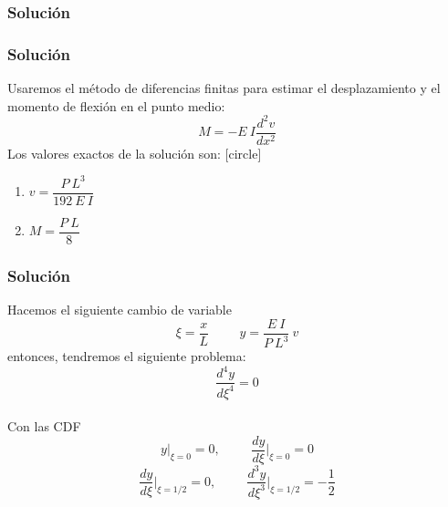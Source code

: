 \subsubsection{Solución}
\begin{frame}
\frametitle{Solución}
Usaremos el método de diferencias finitas para estimar el desplazamiento y el momento de flexión en el punto medio:
\[ M = - E \: I \dfrac{d^{2} v}{d x^{2}} \]
Los valores exactos de la solución son:
[circle]
\begin{enumerate}[<+->]
\item $v = \dfrac{P \: L^{3}}{192 \: E \: I}$ \\
\item $M = \dfrac{P \: L}{8}$
\end{enumerate}
\end{frame}
\begin{frame}
\frametitle{Solución}
Hacemos el siguiente cambio de variable
\[ \xi = \dfrac{x}{L} \hspace{1cm} y = \dfrac{E \: I}{P \: L^{3}} \: v \]
\pause
entonces, tendremos el siguiente problema:
\[ \dfrac{d^{4} y}{d \xi^{4}} = 0 \]
\\
Con las CDF
\[y \vert_{\xi = 0} = 0, \hspace{1cm} \dfrac{d y}{d \xi} \bigg\vert_{\xi = 0} = 0 \]
\[ \dfrac{d y}{d \xi} \bigg\vert_{\xi = 1/2} = 0, \hspace{1cm} \dfrac{d^{3} y}{d \xi^{3}} \bigg\vert_{\xi = 1/2} = - \dfrac{1}{2} \]  
\end{frame}
